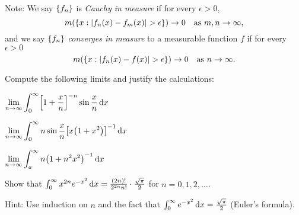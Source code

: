 \documentclass{../homework}
\begin{document}
\begin{problems}
\begin{problems}
    Note: We say \(\{f_n\}\) is \emph{Cauchy in measure} if for
    every \(\epsilon > 0\),
    \[
      m\prn*{\set*{x : \abs*{f_n(x)-f_m(x)} > \epsilon}} \to 0
      \quad \text{as \(m, n \to \infty\)},
    \]
    and we say \(\{f_n\}\) \emph{converges in measure} to a
    measurable function \(f\) if for every \(\epsilon > 0\)
    \[
      m\prn*{\set*{x : \abs*{f_n(x)-f(x)} > \epsilon}} \to 0
      \quad \text{as \(n \to \infty\)}.
    \]

    \begin{solution}
    \end{solution}

  \end{problems}

\item Compute the following limits and justify the calculations:
  \begin{problems}
  \item
    \(\displaystyle\lim_{n\to\infty} \int_0^\infty \sbr*{1+\frac x
      n}^{-n} \sin\frac x n \dif x\)

    \begin{solution}
    \end{solution}

  \item
    \(\displaystyle\lim_{n\to\infty} \int_0^\infty n \sin\frac x n
    \sbr*{x \prn*{1+x^2}}^{-1} \dif x\)

    \begin{solution}
    \end{solution}

  \item
    \(\displaystyle\lim_{n\to\infty} \int_a^\infty n \prn*{1+n^2
      x^2}^{-1} \dif x\)

    \begin{solution}
    \end{solution}

  \end{problems}

\item Show that
  \(\int_0^\infty x^{2n} e^{-x^2} \mathop{}\!\mathrm d x = \frac{(2n)!}{2^{2n} n!}
  \cdot \frac{\sqrt \pi}{2}\) for \(n = 0, 1, 2, \dots\).

  Hint: Use induction on \(n\) and the fact that
  \(\int_0^\infty e^{-x^2} \mathop{}\!\mathrm d x = \frac{\sqrt \pi}{2}\) (Euler's
  formula).

  \begin{solution}
  \end{solution}


\end{problems}
\end{document}
